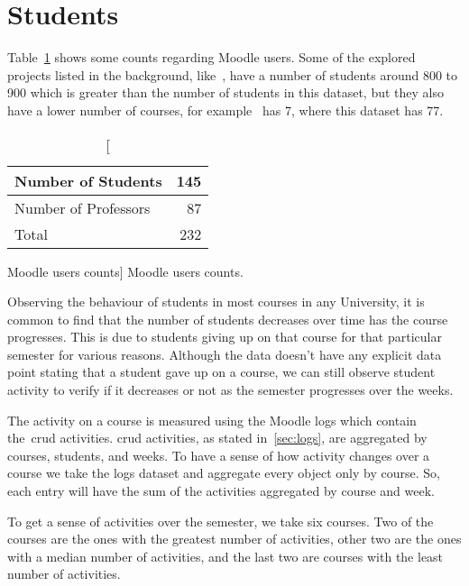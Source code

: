 \section{Students}

Table~\ref{tab:moodle_users_stats} shows some counts regarding Moodle users.
Some of the explored projects listed in the background, like~\cite{ind_001},
have a number of students around 800 to 900 which is greater than the number of
students in this dataset, but they also have a lower number of courses, for
example~\cite{ind_001} has 7, where this dataset has 77.

\begin{table}[h!]
    \centering

    \begin{tabular}{| l | r |}
        \hline
        Number of Students   & 145 \\ \hline
        Number of Professors & 87  \\ \hline
        Total                & 232 \\ \hline
    \end{tabular}

    \caption
        [Moodle users counts]
        {Moodle users counts.}

    \label{tab:moodle_users_stats}
\end{table}

Observing the behaviour of students in most courses in any University, it is
common to find that the number of students decreases over time has the course
progresses. This is due to students giving up on that course for that
particular semester for various reasons. Although the data doesn't have any
explicit data point stating that a student gave up on a course, we can still
observe student activity to verify if it decreases or not as the semester
progresses over the weeks.

The activity on a course is measured using the Moodle logs which contain
the~\gls{crud} activities. \gls{crud} activities, as stated in~\ref{sec:logs},
are aggregated by courses, students, and weeks. To have a sense of how activity
changes over a course we take the logs dataset and aggregate every object only
by course. So, each entry will have the sum of the activities aggregated by
course and week.

To get a sense of activities over the semester, we take six courses. Two of the
courses are the ones with the greatest number of activities, other two are the
ones with a median number of activities, and the last two are courses with the
least number of activities.

